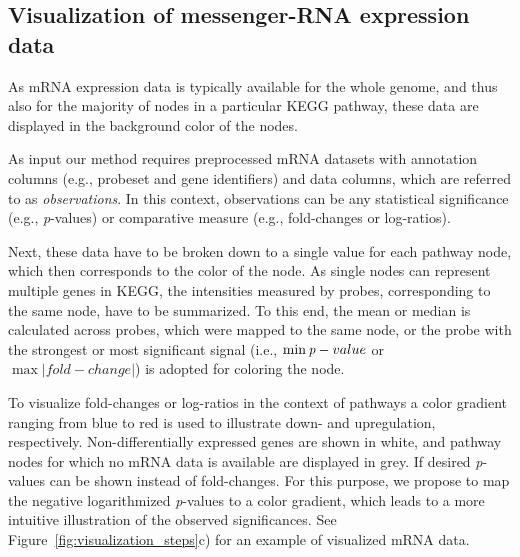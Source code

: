 \documentclass{bioinfo}
\begin{document}
\subsection{Visualization of messenger-RNA expression data} 

As mRNA expression data is typically available for the whole genome, and thus also for the majority
of nodes in a particular KEGG pathway, these data are displayed in the background color of the
nodes.

As input our method requires preprocessed mRNA datasets with annotation columns (e.g., probeset and
gene identifiers) and data columns, which are referred to as \emph{observations}. In this context,
observations can be any statistical significance (e.g., \emph{p}-values) or comparative measure
(e.g., fold-changes or log-ratios).

Next, these data have to be broken down to a single value for each pathway node, which then
corresponds to the color of the node.  As single nodes can represent multiple genes in KEGG, the
intensities measured by probes, corresponding to the same node, have to be summarized. To this end,
the mean or median is calculated across probes, which were mapped to the same node, or the probe
with the strongest or most significant signal (i.e., $\min\emph{p}-value$ or $\max|fold-change|$) is
adopted for coloring the node.

To visualize fold-changes or log-ratios in the context of pathways a color gradient ranging from
blue to red is used to illustrate down- and upregulation, respectively. Non-differentially expressed
genes are shown in white, and pathway nodes for which no mRNA data is available are displayed in
grey. If desired \emph{p}-values can be shown instead of fold-changes. For this purpose, we propose
to map the negative logarithmized \emph{p}-values to a color gradient, which leads to a more
intuitive illustration of the observed significances.  See Figure~\ref{fig:visualization_steps}c)
for an example of visualized mRNA data.

\end{document}
